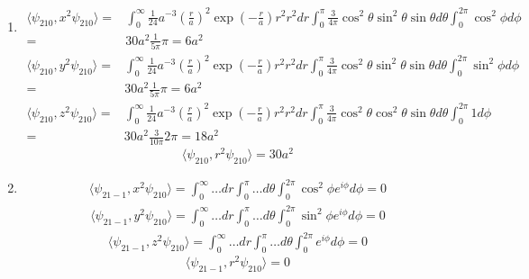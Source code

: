 \begin{enumerate}
\begin{enumerate}
     \item 
    \begin{align*}
        \langle\psi_{210},x^2\psi_{210}\rangle=&
        \int_0^\infty 
        \frac{1}{24}
        a^{-3}
        \left(\frac{r}{a}\right)^2
        \exp(-\frac{r}{a})r^2r^2dr
        \int_0^\pi 
        \frac{3}{4\pi}
        \cos^2\theta 
        \sin^2\theta 
        \sin\theta d\theta 
        \int_0^{2\pi}
        \cos^2\phi 
         d\phi\\
        =&30a^2\frac{1}{5\pi}\pi = 6a^2
    \end{align*}
    \begin{align*}
        \langle\psi_{210},y^2\psi_{210}\rangle=&
        \int_0^\infty 
        \frac{1}{24}
        a^{-3}
        \left(\frac{r}{a}\right)^2
        \exp(-\frac{r}{a})r^2r^2dr
        \int_0^\pi 
        \frac{3}{4\pi}
        \cos^2\theta 
        \sin^2\theta 
        \sin\theta d\theta 
        \int_0^{2\pi}
        \sin^2\phi 
         d\phi\\
        =&30a^2\frac{1}{5\pi}\pi = 6a^2
    \end{align*}
    \begin{align*}
        \langle\psi_{210},z^2\psi_{210}\rangle=&
        \int_0^\infty 
        \frac{1}{24}
        a^{-3}
        \left(\frac{r}{a}\right)^2
        \exp(-\frac{r}{a})r^2r^2dr
        \int_0^\pi 
        \frac{3}{4\pi}
        \cos^2\theta 
        \cos^2\theta 
        \sin\theta d\theta 
        \int_0^{2\pi}
        1
         d\phi\\
        =&30a^2\frac{3}{10\pi}2\pi = 18a^2
    \end{align*}
    $$
    \langle\psi_{210},r^2\psi_{210}\rangle=30a^2
    $$

     \item 
    \begin{align*}
        \langle\psi_{21-1},x^2\psi_{210}\rangle=
        \int_0^\infty 
        \dots dr
        \int_0^\pi 
        \dots  d\theta 
        \int_0^{2\pi}
        \cos^2\phi e^{i\phi}
         d\phi=0
    \end{align*}
    \begin{align*}
        \langle\psi_{21-1},y^2\psi_{210}\rangle=\int_0^\infty 
        \dots dr
        \int_0^\pi 
        \dots  d\theta 
        \int_0^{2\pi}
        \sin^2\phi e^{i\phi}
         d\phi=0
    \end{align*}
    \begin{align*}
        \langle\psi_{21-1},z^2\psi_{210}\rangle=\int_0^\infty 
        \dots dr
        \int_0^\pi 
        \dots  d\theta 
        \int_0^{2\pi}
        e^{i\phi}
         d\phi=0
    \end{align*}
    $$
    \langle\psi_{21-1},r^2\psi_{210}\rangle=0
    $$


\end{enumerate}
\end{enumerate}
